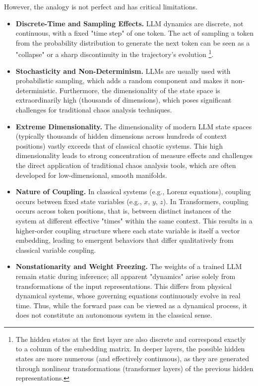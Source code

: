 \documentclass[a4paper,12pt]{article}
\begin{document}
However, the analogy is not perfect and has critical limitations.
\begin{itemize}
    \item \textbf{Discrete-Time and Sampling Effects.} LLM dynamics are discrete, not continuous, with a fixed "time step" of one token. The act of sampling a token from the probability distribution to generate the next token can be seen as a "collapse" or a sharp discontinuity in the trajectory's evolution \footnote{The hidden states at the first layer are also discrete and correspond exactly to a column of the embedding matrix. In deeper layers, the possible hidden states are more numerous (and effectively continuous), as they are generated through nonlinear transformations (transformer layers) of the previous hidden representations.}.
    \item \textbf{Stochasticity and Non-Determinism.} LLMs are usually used with probabilistic sampling, which adds a random component and makes it non-deterministic. Furthermore, the dimensionality of the state space is extraordinarily high (thousands of dimensions), which poses significant challenges for traditional chaos analysis techniques.
    \item \textbf{Extreme Dimensionality.}  
    The dimensionality of modern LLM state spaces (typically thousands of hidden dimensions across hundreds of context positions) vastly exceeds that of classical chaotic systems. This high dimensionality leads to strong concentration of measure effects and challenges the direct application of traditional chaos analysis tools, which are often developed for low-dimensional, smooth manifolds.

    \item \textbf{Nature of Coupling.}  
    In classical systems (e.g., Lorenz equations), coupling occurs between fixed state variables (e.g., $x$, $y$, $z$). In Transformers, coupling occurs across token positions, that is, between distinct instances of the system at different effective "times" within the same context. This results in a higher-order coupling structure where each state variable is itself a vector embedding, leading to emergent behaviors that differ qualitatively from classical variable coupling.

    \item \textbf{Nonstationarity and Weight Freezing.}  
    The weights of a trained LLM remain static during inference; all apparent "dynamics" arise solely from transformations of the input representations. This differs from physical dynamical systems, whose governing equations continuously evolve in real time. Thus, while the forward pass can be viewed as a dynamical process, it does not constitute an autonomous system in the classical sense.

\end{itemize}
\end{document}
